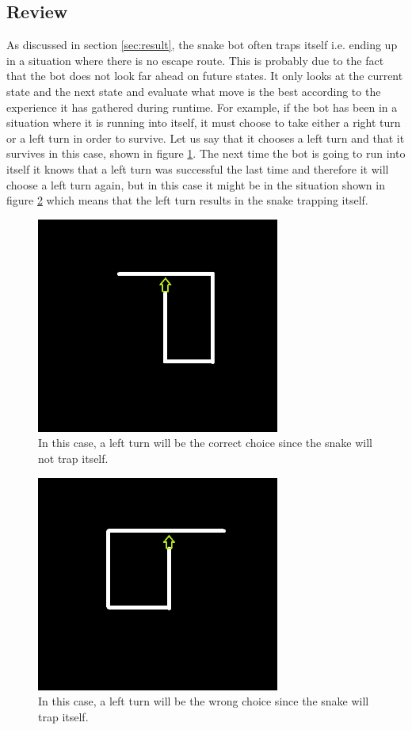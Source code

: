 \documentclass[fleqn,10pt]{SelfArx} %
\begin{document}
\subsection{Review} \label{subsec:review}
As discussed in section \ref{sec:result}, the snake bot often traps itself i.e. ending up in a situation where there is no escape route. This is probably due to the fact that the bot does not look far ahead on future states. It only looks at the current state and the next state and evaluate what move is the best according to the experience it has gathered during runtime. For example, if the bot has been in a situation where it is running into itself, it must choose to take either a right turn or a left turn in order to survive. Let us say that it chooses a left turn and that it survives in this case, shown in figure \ref{fig:snaketrap1}. The next time the bot is going to run into itself it knows that a left turn was successful the last time and therefore it will choose a left turn again, but in this case it might be in the situation shown in figure \ref{fig:snaketrap2} which means that the left turn results in the snake trapping itself. 

\begin{figure}
\includegraphics[width=8cm]{SnakeTrap1.png}
\caption{In this case, a left turn will be the correct choice since the snake will not trap itself.}
\label{fig:snaketrap1}
\end{figure}

\begin{figure}
\includegraphics[width=8cm]{SnakeTrap2.png}
\caption{In this case, a left turn will be the wrong choice since the snake will trap itself.}
\label{fig:snaketrap2}
\end{figure}
\end{document}
